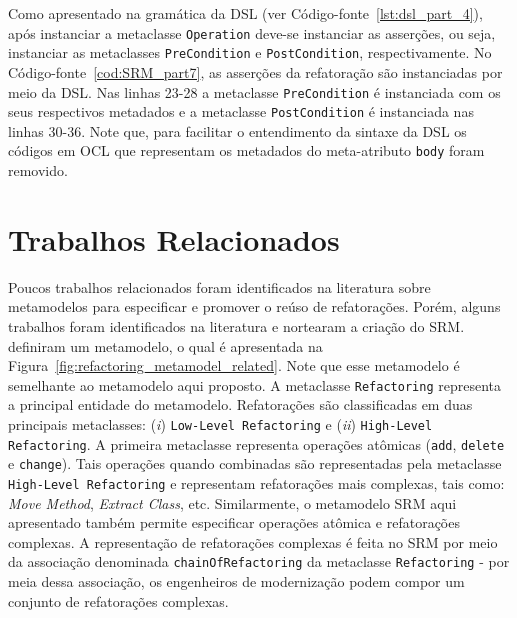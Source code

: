 Como apresentado na gramática da DSL (ver Código-fonte~\ref{lst:dsl_part_4}), após instanciar a metaclasse \texttt{Operation} deve-se instanciar as asserções, ou seja, instanciar as metaclasses \texttt{PreCondition} e \texttt{PostCondition}, respectivamente. No Código-fonte~\ref{cod:SRM_part7}, as asserções da refatoração são instanciadas por meio da DSL. Nas linhas 23-28 a metaclasse \texttt{PreCondition} é instanciada com os seus respectivos metadados e a metaclasse \texttt{PostCondition} é instanciada nas linhas 30-36. Note que, para facilitar o entendimento da sintaxe da DSL os códigos em OCL que representam os metadados do meta-atributo \texttt{body} foram removido. 


\section{Trabalhos Relacionados}\label{sec:trabalhos_relacionais_SRM}

Poucos trabalhos relacionados foram identificados na literatura sobre metamodelos para especificar e promover o reúso de refatorações. Porém, alguns trabalhos foram identificados na literatura e nortearam a criação do SRM. ~ definiram um metamodelo, o qual é apresentada na Figura~\ref{fig:refactoring_metamodel_related}. Note que esse metamodelo é semelhante ao metamodelo aqui proposto. A metaclasse \texttt{Refactoring} representa a principal entidade do metamodelo. Refatorações são classificadas em duas principais metaclasses: (\textit{i}) \texttt{Low-Level Refactoring} e (\textit{ii}) \texttt{High-Level Refactoring}. A primeira metaclasse representa operações atômicas (\texttt{add}, \texttt{delete} e \texttt{change}). Tais operações quando combinadas são representadas pela metaclasse \texttt{High-Level Refactoring} e representam refatorações mais complexas, tais como: \textit{Move Method}, \textit{Extract Class}, etc. Similarmente, o metamodelo SRM aqui apresentado também permite especificar operações atômica e refatorações complexas. A representação de refatorações complexas é feita no SRM por meio da associação denominada \texttt{chainOfRefactoring} da metaclasse \texttt{Refactoring} - por meia dessa associação, os engenheiros de modernização podem compor um conjunto de refatorações complexas.

